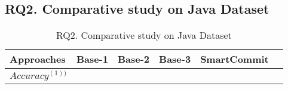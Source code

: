 \subsection{{\bf RQ2. Comparative study on Java Dataset}}

\begin{table}[t]
	\caption{RQ2. Comparative study on Java Dataset}
	\vspace{-0.1in}
	\begin{center}
		\footnotesize
		\tabcolsep 4pt
		\renewcommand{\arraystretch}{1} \begin{tabular}{p{1.4cm}<{\centering}|p{0.7cm}<{\centering}p{0.7cm}<{\centering}p{0.7cm}<{\centering}p{1.5cm}<{\centering}|p{0.7cm}<{\centering}}
			
			\hline
			Approaches          & Base-1 & Base-2 & Base-3 & SmartCommit & \tool\\
			\hline
			$Accuracy^{(1))}$   &                &			 	&				   &		&      \\
			\hline
		\end{tabular}
		\label{RQ2-result}
	\end{center}
\end{table}